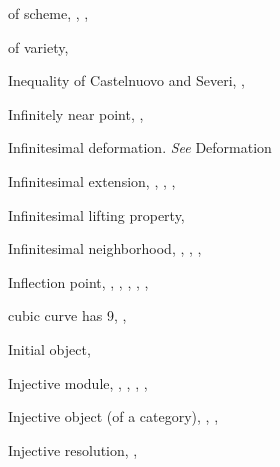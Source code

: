 {{\noindent\hspace*{7.5bp}of scheme, , , \par
\noindent\hspace*{7.5bp}of variety, \par
\noindent\hspace*{0.0bp}Inequality of Castelnuovo and Severi, ,\par
\noindent\hspace*{15.0bp}\par
\noindent\hspace*{0.0bp}Infinitely near point, , \par
\noindent\hspace*{0.0bp}Infinitesimal deformation. \emph{See} Deformation\par
\noindent\hspace*{0.0bp}Infinitesimal extension, , , , \par
\noindent\hspace*{0.0bp}Infinitesimal lifting property, \par
\noindent\hspace*{0.0bp}Infinitesimal neighborhood, , , ,\par
\noindent\hspace*{15.0bp}\par
\noindent\hspace*{0.0bp}Inflection point, , , , , , \par
\noindent\hspace*{7.5bp}cubic curve has 9, , \par
\noindent\hspace*{0.0bp}Initial object, \par
\noindent\hspace*{0.0bp}Injective module, , , , , \par
\noindent\hspace*{0.0bp}Injective object (of a category), , , \par
\noindent\hspace*{0.0bp}Injective resolution, , \par
}}
